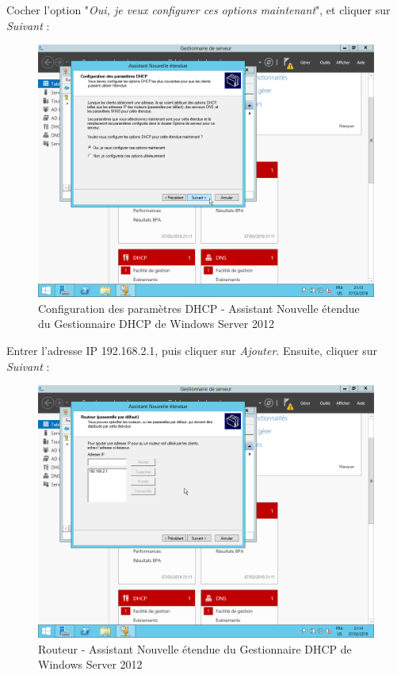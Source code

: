 \newpage
Cocher l'option "\textit{Oui, je veux configurer ces options maintenant}", et cliquer sur \textit{Suivant} :
\begin{figure}[h!]
    \begin{center}
        \includegraphics[scale=0.6]{WS2012_Screenshots/47.png}
        \caption{Configuration des paramètres DHCP - Assistant Nouvelle étendue du Gestionnaire DHCP de Windows Server 2012}
        \label{WS2012_Screenshots/47}
    \end{center}
\end{figure}
\FloatBarrier

\newpage
Entrer l'adresse IP 192.168.2.1, puis cliquer sur \textit{Ajouter}. Ensuite, cliquer sur \textit{Suivant} :
\begin{figure}[h!]
    \begin{center}
        \includegraphics[scale=0.6]{WS2012_Screenshots/48.png}
        \caption{Routeur - Assistant Nouvelle étendue du Gestionnaire DHCP de Windows Server 2012}
        \label{WS2012_Screenshots/48}
    \end{center}
\end{figure}
\FloatBarrier

